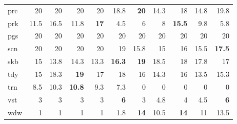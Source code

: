 \begin{center}
\begin{tabular}{lrrrrrrrrrr}
prc & 20 & 20 & 20 & 20 & 18.8 & \textbf{20} & 14.3 & 18 & 14.8 & 19.8\\
prk & 11.5 & 16.5 & 11.8 & \textbf{17} & 4.5 & 6 & 8 & \textbf{15.5} & 9.8 & 5.8\\
pgs & 20 & 20 & 20 & 20 & 20 & 20 & 20 & 20 & 20 & 20\\
scn & 20 & 20 & 20 & 20 & 19 & 15.8 & 15 & 16 & 15.5 & \textbf{17.5}\\
skb & 15 & 13.8 & 14.3 & 13.3 & \textbf{16.3} & \textbf{19} & 18.5 & 18 & 17.8 & 17\\
tdy & 15 & 18.3 & \textbf{19} & 17 & 18 & 16 & 14.3 & 16 & 13.5 & 15.3\\
trn & 8.5 & 10.3 & \textbf{10.8} & 9.3 & 7.3 & 0 & 0 & 0 & 0 & 0\\
vst & 3 & 3 & 3 & 3 & \textbf{6} & 3 & 4.8 & 4 & 4.5 & \textbf{6}\\
wdw & 1 & 1 & 1 & 1 & 1.8 & \textbf{14} & 10.5 & \textbf{14} & 11 & 13.5\\
\hline
\end{tabular}
\end{center}

